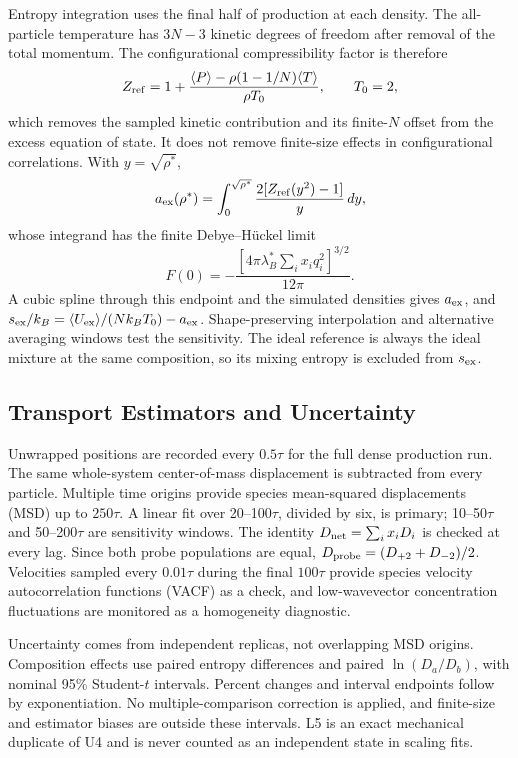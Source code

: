 \documentclass[aps,pre,twocolumn,superscriptaddress,floatfix]{revtex4-2}
\begin{document}
Entropy integration uses the final half of production at each density. The all-particle temperature has $3N-3$ kinetic degrees of freedom after removal of the total momentum. The configurational compressibility factor is therefore
\begin{equation}
Z_{\rm ref}=1+\frac{\langle P\rangle-\rho(1-1/N)\langle T\rangle}{\rho T_0},\qquad T_0=2,
\label{eq:config_pressure}
\end{equation}
which removes the sampled kinetic contribution and its finite-$N$ offset from the excess equation of state. It does not remove finite-size effects in configurational correlations. With $y=\sqrt{\rho^*}$,
\begin{equation}
a_{\rm ex}(\rho^*)=\int_0^{\sqrt{\rho^*}}\frac{2[Z_{\rm ref}(y^2)-1]}{y}\,dy,
\label{eq:new_ti}
\end{equation}
whose integrand has the finite Debye--H\"uckel limit
\begin{equation}
F(0)=-\frac{[4\pi\lambda_B^*\sum_i x_iq_i^2]^{3/2}}{12\pi}.
\label{eq:new_endpoint}
\end{equation}
A cubic spline through this endpoint and the simulated densities gives $a_{\rm ex}$, and $s_{\rm ex}/k_B=\langle U_{\rm ex}\rangle/(Nk_BT_0)-a_{\rm ex}$. Shape-preserving interpolation and alternative averaging windows test the sensitivity. The ideal reference is always the ideal mixture at the same composition, so its mixing entropy is excluded from $s_{\rm ex}$.

\subsection{Transport Estimators and Uncertainty}

Unwrapped positions are recorded every $0.5\tau$ for the full dense production run. The same whole-system center-of-mass displacement is subtracted from every particle. Multiple time origins provide species mean-squared displacements (MSD) up to $250\tau$. A linear fit over 20--100$\tau$, divided by six, is primary; 10--50$\tau$ and 50--200$\tau$ are sensitivity windows. The identity $D_{\rm net}=\sum_i x_iD_i$ is checked at every lag. Since both probe populations are equal, $D_{\rm probe}=(D_{+2}+D_{-2})/2$. Velocities sampled every $0.01\tau$ during the final $100\tau$ provide species velocity autocorrelation functions (VACF) as a check, and low-wavevector concentration fluctuations are monitored as a homogeneity diagnostic.

Uncertainty comes from independent replicas, not overlapping MSD origins. Composition effects use paired entropy differences and paired $\ln(D_a/D_b)$, with nominal 95\% Student-$t$ intervals. Percent changes and interval endpoints follow by exponentiation. No multiple-comparison correction is applied, and finite-size and estimator biases are outside these intervals. L5 is an exact mechanical duplicate of U4 and is never counted as an independent state in scaling fits.
\end{document}
